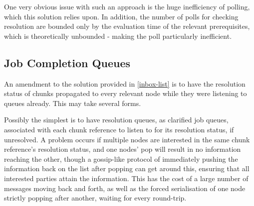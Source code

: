 

One very obvious issue with such an approach is the huge inefficiency of polling, which this solution relies upon.
In addition, the number of polls for checking resolution are bounded only by the evaluation time of the relevant prerequisites, which is theoretically unbounded - making the poll particularly inefficient.

\subsection{Job Completion Queues}




An amendment to the solution provided in \cref{inbox-list} is to have the resolution status of chunks propagated to every relevant node while they were listening to queues already.
This may take several forms.

Possibly the simplest is to have resolution queues, as clarified job queues, associated with each chunk reference to listen to for its resolution status, if unresolved.
A problem occurs if multiple nodes are interested in the same chunk reference's resolution status, and one nodes' pop will result in no information reaching the other, though a gossip-like protocol of immediately pushing the information back on the list after popping can get around this, ensuring that all interested parties attain the information.
This has the cost of a large number of messages moving back and forth, as well as the forced serialisation of one node strictly popping after another, waiting for every round-trip.

